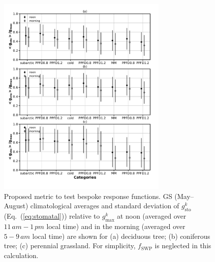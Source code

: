 \documentclass[bg, manuscript]{copernicus}
\begin{document}
\begin{figure}[t]
  \includegraphics[width=8.3cm]{fig10}
  \caption{Proposed metric to test bespoke response functions. GS (May--August) climatological averages and standard deviation of $g_\mathrm{sto}^k$ (Eq.~(\ref{eq:stomatal})) relative to $g_\mathrm{max}^k$ at noon (averaged over $11\,\unit{am}-1\,\unit{pm}$ local time) and in the morning (averaged over $5-9\,\unit{am}$ local time) are shown for (a) deciduous tree; (b) coniferous tree; (c) perennial grassland. For simplicity, $f_\mathrm{SWP}$ is neglected in this calculation.}
  \label{fig:javis_func_opt_mean}
\end{figure}
\end{document}
